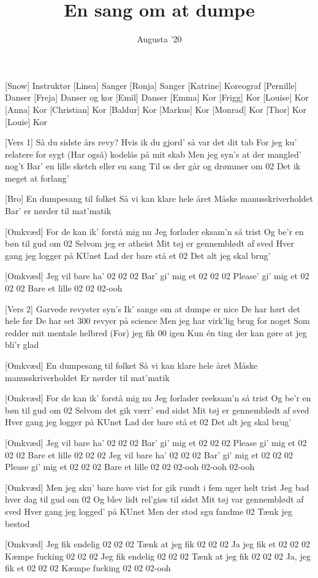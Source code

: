 \documentclass[a4paper,11pt]{article}
\title{En sang om at dumpe}
\author{Augusta '20}
\begin{document}
\maketitle

\begin{roles}
[Snow] Instruktør 
[Linea] Sanger
[Ronja] Sanger
[Katrine] Koreograf
[Pernille] Danser
[Freja] Danser og kor
[Emil] Danser
[Emma] Kor
[Frigg] Kor
[Louise] Kor
[Anna] Kor
[Christian] Kor
[Baldur] Kor
[Markus] Kor
[Monrad] Kor
[Thor] Kor
[Louie] Kor
\end{roles}

\begin{song}
[Vers 1] Så du sidste års revy?
Hvis ik du gjord’ så var det dit tab
For jeg ku’ relatere for sygt
(Har også) kodelås på mit skab
Men jeg syn’s at der mangled’ nog’t
Bar’ en lille sketch eller en sang
Til os der går og drømmer om 02
Det ik meget at forlang’


[Bro] En dumpesang til folket
Så vi kan klare hele året
Måske manusskriverholdet
Bar’ er nørder til mat’matik

[Omkvæd] For de kan ik’ forstå mig nu
Jeg forlader eksam’n så trist
Og be’r en bøn til gud om 02
Selvom jeg er atheist
Mit tøj er gennemblødt af sved
Hver gang jeg logger på KUnet
Lad der bare stå et 02
Det alt jeg skal brug’

[Omkvæd] Jeg vil bare ha' 02 02 02
Bar’ gi’ mig et 02 02 02
Please’ gi’ mig et 02 02 02
Bare et lille 02 02
02-ooh

[Vers 2] Garvede revyster syn’s
Ik’ sange om at dumpe er nice
De har hørt det hele før
De har set 300 revyer på science
Men jeg har virk’lig brug for noget
Som redder mit mentale helbred
(For) jeg fik 00 igen
Kun én ting der kan gøre at jeg bli’r glad

[Omkvæd] En dumpesang til folket
Så vi kan klare hele året
Måske manusskriverholdet
Er nørder til mat’matik

[Omkvæd] For de kan ik’ forstå mig nu
Jeg forlader reeksam’n så trist
Og be’r en bøn til gud om 02
Selvom det gik værr’ end sidst
Mit tøj er gennemblødt af sved
Hver gang jeg logger på KUnet
Lad der bare stå et 02
Det alt jeg skal brug’

[Omkvæd] Jeg vil bare ha' 02 02 02
Bar’ gi’ mig et 02 02 02
Please gi’ mig et 02 02 02
Bare et lille 02 02 02
Jeg vil bare ha' 02 02 02
Bar’ gi’ mig et 02 02 02
Please gi’ mig et 02 02 02
Bare et lille 02 02
02-ooh
02-ooh
02-ooh

[Omkvæd] Men jeg sku’ bare have vist
for gik rundt i fem uger helt trist
Jeg bad hver dag til gud om 02
Og blev lidt rel’giøs til sidst
Mit tøj var gennemblødt af sved
Hver gang jeg logged’ på KUnet
Men der stod sgu fandme 02
Tænk jeg bestod

[Omkvæd] Jeg fik endelig 02 02 02
Tænk at jeg fik 02 02 02
Ja jeg fik et 02 02 02
Kæmpe fucking 02 02 02
Jeg fik endelig 02 02 02
Tænk at jeg fik 02 02 02
Ja, jeg fik et 02 02 02
Kæmpe fucking 02 02
02-ooh



\end{song}
\end{document}
